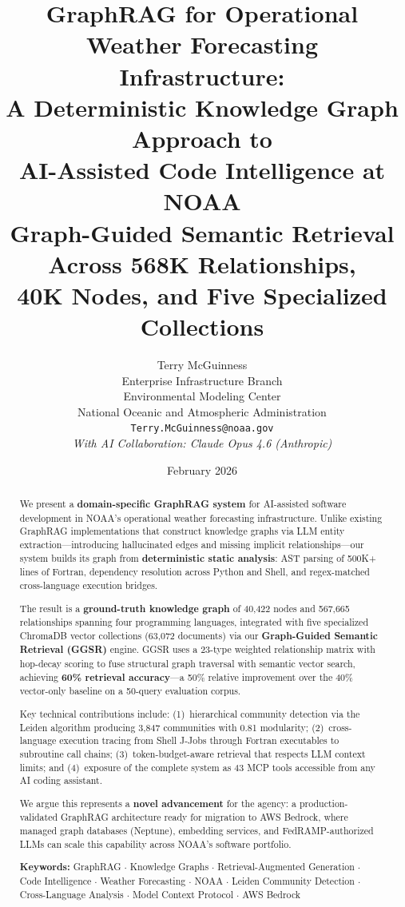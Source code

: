 \documentclass[11pt,letterpaper]{article}
\title{%
    \textbf{GraphRAG for Operational Weather Forecasting Infrastructure:}\\[0.3em]
    \textbf{A Deterministic Knowledge Graph Approach to}\\[0.3em]
    \textbf{AI-Assisted Code Intelligence at NOAA}\\[0.8em]
    \large Graph-Guided Semantic Retrieval Across 568K Relationships,\\
    \large 40K Nodes, and Five Specialized Collections
}
\author{
    Terry McGuinness\\
    Enterprise Infrastructure Branch\\
    Environmental Modeling Center\\
    National Oceanic and Atmospheric Administration\\
    \texttt{Terry.McGuinness@noaa.gov}\\[0.3cm]
    \textit{With AI Collaboration: Claude Opus 4.6 (Anthropic)}
}
\date{February 2026}
\begin{document}
\maketitle

\begin{abstract}
We present a \textbf{domain-specific GraphRAG system} for AI-assisted
software development in NOAA's operational weather forecasting
infrastructure. Unlike existing GraphRAG implementations that construct
knowledge graphs via LLM entity extraction---introducing hallucinated
edges and missing implicit relationships---our system builds its graph
from \textbf{deterministic static analysis}: AST parsing of 500K+
lines of Fortran, dependency resolution across Python and Shell, and
regex-matched cross-language execution bridges.

The result is a \textbf{ground-truth knowledge graph} of 40,422 nodes
and 567,665 relationships spanning four programming languages, integrated
with five specialized ChromaDB vector collections (63,072 documents)
via our \textbf{Graph-Guided Semantic Retrieval (GGSR)} engine. GGSR
uses a 23-type weighted relationship matrix with hop-decay scoring to
fuse structural graph traversal with semantic vector search, achieving
\textbf{60\% retrieval accuracy}---a 50\% relative improvement over
the 40\% vector-only baseline on a 50-query evaluation corpus.

Key technical contributions include: (1)~hierarchical community detection
via the Leiden algorithm producing 3,847 communities with 0.81 modularity;
(2)~cross-language execution tracing from Shell J-Jobs through Fortran
executables to subroutine call chains; (3)~token-budget-aware retrieval
that respects LLM context limits; and (4)~exposure of the complete system
as 43 MCP tools accessible from any AI coding assistant.

We argue this represents a \textbf{novel advancement} for the agency:
a production-validated GraphRAG architecture ready for migration to
AWS Bedrock, where managed graph databases (Neptune), embedding services,
and FedRAMP-authorized LLMs can scale this capability across NOAA's
software portfolio.

\medskip\noindent
\textbf{Keywords:}
GraphRAG $\cdot$ Knowledge Graphs $\cdot$ Retrieval-Augmented Generation
$\cdot$ Code Intelligence $\cdot$ Weather Forecasting $\cdot$ NOAA
$\cdot$ Leiden Community Detection $\cdot$ Cross-Language Analysis
$\cdot$ Model Context Protocol $\cdot$ AWS Bedrock
\end{abstract}
\end{document}
